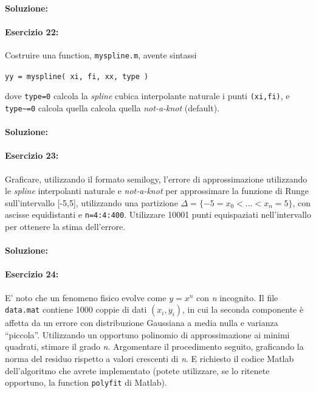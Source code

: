 \documentclass[12pt]{article}
\begin{document}
\paragraph{Soluzione:}


\paragraph{Esercizio 22:}
Costruire una function, \texttt{myspline.m}, avente sintassi
\begin{center}
\texttt{yy = myspline( xi, fi, xx, type )}
\end{center}
dove \texttt{type=0} calcola la \emph{spline} cubica interpolante naturale i punti \texttt{(xi,fi)}, e \texttt{type\textasciitilde=0} calcola quella calcola quella
\emph{not-a-knot} (default).
\paragraph{Soluzione:}


\paragraph{Esercizio 23:}
Graficare, utilizzando il formato semilogy, l'errore di approssimazione utilizzando le
\emph{spline} interpolanti naturale e \emph{not-a-knot} per approssimare la funzione di Runge sull'intervallo [-5,5],
utilizzando una partizione \(\Delta = \{-5=x_0 <...<x_n=5\}\), con ascisse equidistanti e \texttt{n=4:4:400}.
Utilizzare 10001 punti equispaziati nell'intervallo \text{[-5, 5]} per ottenere la stima dell'errore.

\paragraph{Soluzione:}


\paragraph{Esercizio 24:}
E' noto che un fenomeno fisico evolve come \(y = x^{n}\) con \emph{n} incognito. 
Il file \texttt{data.mat} contiene 1000 coppie di dati \((x_{i},y_{i})\), in cui la seconda componente è affetta da un errore con distribuzione Gaussiana a media nulla e varianza “piccola”. Utilizzando un opportuno polinomio
di approssimazione ai minimi quadrati, stimare il grado \emph{n}. Argomentare il procedimento seguito,
graficando la norma del residuo rispetto a valori crescenti di \emph{n}. E richiesto il codice Matlab dell'algoritmo 
che avrete implementato (potete utilizzare, se lo ritenete opportuno, la function \texttt{polyfit}
di Matlab).
\end{document}
